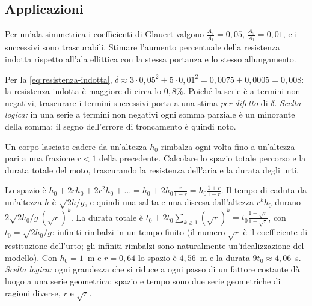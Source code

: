 \subsection*{Applicazioni}

\begin{esercizio}
Per un'ala simmetrica i coefficienti di Glauert valgono $\frac{A_{3}}{A_{1}}=0{,}05$, $\frac{A_{5}}{A_{1}}=0{,}01$,
e i successivi sono trascurabili. Stimare l'aumento percentuale della resistenza indotta
rispetto all'ala ellittica con la stessa portanza e lo stesso allungamento.
\begin{soluzione}
Per la \eqref{eq:resistenza-indotta}, $\delta\approx3\cdot0{,}05^{2}+5\cdot0{,}01^{2}=0{,}0075+0{,}0005=0{,}008$: la
resistenza indotta è maggiore di circa lo $0{,}8\%$. Poiché la serie è a termini non
negativi, trascurare i termini successivi porta a una stima \emph{per difetto} di $\delta$.
\emph{Scelta logica:} in una serie a termini non negativi ogni somma parziale è un
minorante della somma; il segno dell'errore di troncamento è quindi noto.
\end{soluzione}
\end{esercizio}

\begin{esercizio}
Un corpo lasciato cadere da un'altezza $h_{0}$ rimbalza ogni volta fino a un'altezza pari a
una frazione $r<1$ della precedente. Calcolare lo spazio totale percorso e la durata
totale del moto, trascurando la resistenza dell'aria e la durata degli urti.
\begin{soluzione}
Lo spazio è $h_{0}+2rh_{0}+2r^{2}h_{0}+\dots=h_{0}+2h_{0}\frac r{1-r}=h_{0}\frac{1+r}{1-r}$. Il tempo di caduta da
un'altezza $h$ è $\sqrt{2h/g}$, e quindi una salita e una discesa dall'altezza $r^{k}h_{0}$ durano
$2\sqrt{2h_{0}/g}\,(\sqrt r)^{k}$. La durata totale è
$t_{0}+2t_{0}\sum_{k\ge1}(\sqrt r)^{k}=t_{0}\frac{1+\sqrt r}{1-\sqrt r}$, con $t_{0}=\sqrt{2h_{0}/g}$: infiniti rimbalzi in
un tempo finito (il numero $\sqrt r$ è il coefficiente di restituzione dell'urto; gli
infiniti rimbalzi sono naturalmente un'idealizzazione del modello). Con $h_{0}=1$~m e
$r=0{,}64$ lo spazio è $4{,}56$~m e la durata
$9t_{0}\approx4{,}06$~s. \emph{Scelta logica:} ogni grandezza che si riduce a ogni passo di un
fattore costante dà luogo a una serie geometrica; spazio e tempo sono due serie
geometriche di ragioni diverse, $r$ e $\sqrt r$.
\end{soluzione}
\end{esercizio}

